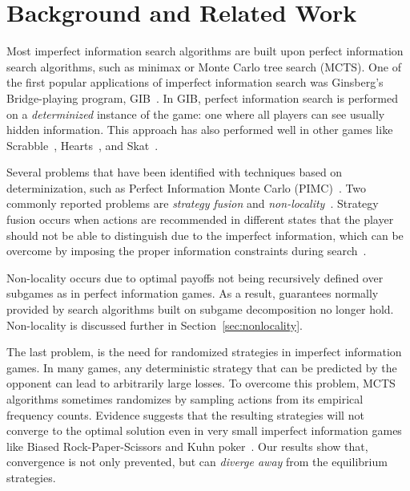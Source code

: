 \documentclass{aamas2015}
\begin{document}

\section{Background and Related Work}

Most imperfect information search algorithms are built upon perfect information search algorithms, such as minimax or Monte Carlo tree search (MCTS).  
One of the first popular applications of imperfect information search was Ginsberg's Bridge-playing program, GIB~\cite{Ginsberg96Partition,Ginsberg01}. 
In GIB, perfect information search is performed on a {\it determinized} instance of the game: one where all players can see usually hidden information. 
This approach has also performed well in other games like Scrabble~\cite{Sheppard02World}, 
Hearts~\cite{Sturtevant08An}, and Skat~\cite{Buro09Improving}. 

Several problems that have been identified with techniques based on determinization, such as Perfect Information Monte Carlo
(PIMC)~\cite{Long10Understanding}. 
Two commonly reported problems are {\it strategy fusion} and {\it non-locality}~\cite{Frank98Finding}.
Strategy fusion occurs when actions are recommended in different states that the player 
should not be able to distinguish due to the imperfect information, which
can be overcome by imposing the proper information constraints during 
search~\cite{Frank98Finding,Ciancarini10Kriegspiel,Ponsen11Computing,Lisy12peg,Cowling12ISMCTS}. 

Non-locality occurs due to optimal payoffs not being recursively defined over subgames as  
in perfect information games. As a result, guarantees normally provided by search algorithms built on 
subgame decomposition no longer hold. Non-locality is discussed further in Section~\ref{sec:nonlocality}.  

The last problem, %
is the need for randomized strategies in imperfect information games. In many games, any deterministic 
strategy that can be predicted by the opponent can lead to arbitrarily large losses.
To overcome this problem, MCTS algorithms sometimes randomizes by sampling actions from its empirical frequency counts.
Evidence suggests that the resulting strategies will not converge to the optimal solution even in very
small imperfect information games like Biased Rock-Paper-Scissors and Kuhn poker~\cite{Shafiei09,Ponsen11Computing}.
Our results show that, convergence is not only prevented, but can {\it diverge away} from the equilibrium strategies.
\end{document}
